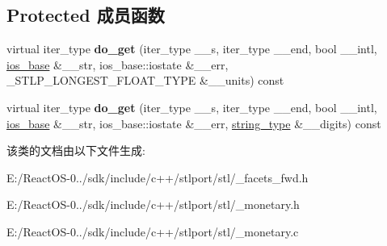 \subsection*{Protected 成员函数}
\begin{DoxyCompactItemize}
\item 
\mbox{\label{classmoney__get_a8d7e6b9dab530e5554daf4868d1b9e48}} 
virtual iter\+\_\+type {\bfseries do\+\_\+get} (iter\+\_\+type \+\_\+\+\_\+s, iter\+\_\+type \+\_\+\+\_\+end, bool \+\_\+\+\_\+intl, \hyperlink{classios__base}{ios\+\_\+base} \&\+\_\+\+\_\+str, ios\+\_\+base\+::iostate \&\+\_\+\+\_\+err, \+\_\+\+S\+T\+L\+P\+\_\+\+L\+O\+N\+G\+E\+S\+T\+\_\+\+F\+L\+O\+A\+T\+\_\+\+T\+Y\+PE \&\+\_\+\+\_\+units) const
\item 
\mbox{\label{classmoney__get_a8a63f20f28d3470f8568f6c9a5bb55a0}} 
virtual iter\+\_\+type {\bfseries do\+\_\+get} (iter\+\_\+type \+\_\+\+\_\+s, iter\+\_\+type \+\_\+\+\_\+end, bool \+\_\+\+\_\+intl, \hyperlink{classios__base}{ios\+\_\+base} \&\+\_\+\+\_\+str, ios\+\_\+base\+::iostate \&\+\_\+\+\_\+err, \hyperlink{classbasic__string}{string\+\_\+type} \&\+\_\+\+\_\+digits) const
\end{DoxyCompactItemize}


该类的文档由以下文件生成\+:\begin{DoxyCompactItemize}
\item 
E\+:/\+React\+O\+S-\/0../sdk/include/c++/stlport/stl/\+\_\+facets\+\_\+fwd.\+h\item 
E\+:/\+React\+O\+S-\/0../sdk/include/c++/stlport/stl/\+\_\+monetary.\+h\item 
E\+:/\+React\+O\+S-\/0../sdk/include/c++/stlport/stl/\+\_\+monetary.\+c\end{DoxyCompactItemize}
